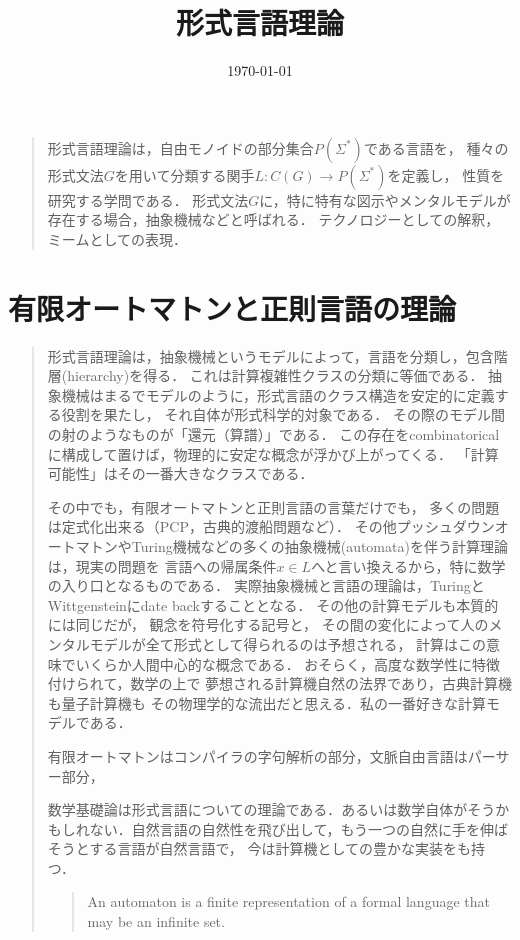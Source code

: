 \documentclass[uplatex, dvipdfmx]{jsreport}
\title{形式言語理論}
\author{}
\date{\today}
\begin{document}
\tableofcontents

\begin{quotation}
    形式言語理論は，自由モノイドの部分集合$P(\Sigma^*)$である言語を，
    種々の形式文法$G$を用いて分類する関手$L:C(G)\to P(\Sigma^*)$を定義し，
    性質を研究する学問である．
    形式文法$G$に，特に特有な図示やメンタルモデルが存在する場合，抽象機械などと呼ばれる．
    テクノロジーとしての解釈，ミームとしての表現．
\end{quotation}

\chapter{有限オートマトンと正則言語の理論}

\begin{quotation}
    形式言語理論は，抽象機械というモデルによって，言語を分類し，包含階層(hierarchy)を得る．
    これは計算複雑性クラスの分類に等価である．
    抽象機械はまるでモデルのように，形式言語のクラス構造を安定的に定義する役割を果たし，
    それ自体が形式科学的対象である．
    その際のモデル間の射のようなものが「還元（算譜）」である．
    この存在をcombinatoricalに構成して置けば，物理的に安定な概念が浮かび上がってくる．
    「計算可能性」はその一番大きなクラスである．

    その中でも，有限オートマトンと正則言語の言葉だけでも，
    多くの問題は定式化出来る（PCP，古典的渡船問題など）．
    その他プッシュダウンオートマトンやTuring機械などの多くの抽象機械(automata)を伴う計算理論は，現実の問題を
    言語への帰属条件$x\in L$へと言い換えるから，特に数学の入り口となるものである．
    実際抽象機械と言語の理論は，TuringとWittgensteinにdate backすることとなる．
    その他の計算モデルも本質的には同じだが，
    観念を符号化する記号と，
    その間の変化によって人のメンタルモデルが全て形式として得られるのは予想される，
    計算はこの意味でいくらか人間中心的な概念である．
    おそらく，高度な数学性に特徴付けられて，数学の上で
    夢想される計算機自然の法界であり，古典計算機も量子計算機も
    その物理学的な流出だと思える．私の一番好きな計算モデルである．

    有限オートマトンはコンパイラの字句解析の部分，文脈自由言語はパーサー部分，

    数学基礎論は形式言語についての理論である．あるいは数学自体がそうかもしれない．自然言語の自然性を飛び出して，もう一つの自然に手を伸ばそうとする言語が自然言語で，
    今は計算機としての豊かな実装をも持つ．
    \begin{quote}
    An automaton is a finite representation of a formal language that may be an infinite set.
    \end{quote}


\end{quotation}
\end{document}
